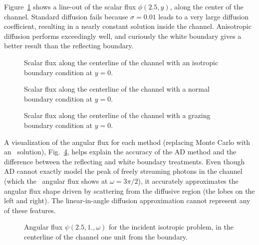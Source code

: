 Figure~\ref{fig:bcChannelIsotropic} shows a line-out of the scalar flux
$\phi(2.5,y)$, along the center
of the channel. Standard diffusion fails because $\sigma=0.01$ leads to a very
large diffusion coefficient, resulting in a nearly constant solution inside the
channel. Anisotropic diffusion performs exceedingly well, and curiously the
white boundary gives a better result than the reflecting boundary.

\begin{figure}[htb]
  \centering\small
  \hspace{-.5in}
  
  \hspace{-.5in}
  \caption{Scalar flux along the centerline of the channel with an isotropic
  boundary condition at $y=0$.}
  \label{fig:bcChannelIsotropic}
\end{figure}

\begin{figure}[htb]
  \centering\small
  \hspace{-.5in}
  
  \hspace{-.5in}
  \caption{Scalar flux along the centerline of the channel with a normal
  boundary condition at $y=0$.}
  \label{fig:bcChannelDelta}
\end{figure}

\begin{figure}[htb]
  \centering\small
  \hspace{-.5in}
  
  \hspace{-.5in}
  \caption{Scalar flux along the centerline of the channel with a grazing
  boundary condition at $y=0$.}
  \label{fig:bcChannelGrazing}
\end{figure}

A visualization of the angular flux for each method (replacing Monte Carlo with
an \SN\ solution), Fig.~\ref{fig:bcChannelIsotropicAngular}, helps explain the
accuracy
of the AD method and the difference between the reflecting and white boundary
treatments. Even though AD cannot exactly model the peak of freely streaming
photons in the channel (which the \SN\ angular flux shows at $\omega=3\pi/2$),
it accurately approximates the angular flux shape driven by scattering from the
diffusive region (the lobes on the left and right).
The linear-in-angle diffusion approximation cannot represent any of these
features.  

\begin{figure}[htb!]
  \centering\small
  \vspace{-.25in}
  \hspace{-.5in}
  
  \hspace{-.5in}
  \vspace{-.25in}
  \caption{Angular flux $\psi(2.5, 1., \omega)$ for the incident isotropic
  problem, in the centerline of the channel one unit from the boundary.}
  \label{fig:bcChannelIsotropicAngular}
\end{figure}

